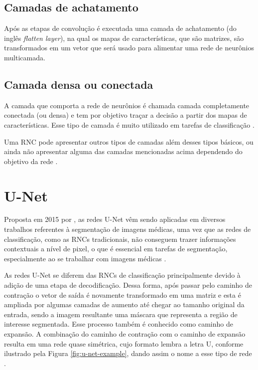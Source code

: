 \subsection{Camadas de achatamento}

Após as etapas de convolução é executada uma camada de achatamento (do inglês \textit{flatten layer}), na qual os mapas de características, que são matrizes, são transformados em um vetor que será usado para alimentar uma rede de neurônios multicamada. 

\subsection{Camada densa ou conectada}
A camada que comporta a rede de neurônios é chamada camada completamente conectada (ou densa) e tem por objetivo traçar a decisão a partir dos mapas de características. Esse tipo de camada é muito utilizado em tarefas de classificação \cite{rawat2017deep}.

Uma \ac{RNC} pode apresentar outros tipos de camadas além desses tipos básicos, ou ainda não apresentar alguma das camadas mencionadas acima dependendo do objetivo da rede \cite{mueller2019deep}.

\section{U-Net}
Proposta em 2015 por \cite{ronneberger2015u}, as redes U-Net vêm sendo aplicadas em diversos trabalhos referentes à segmentação de imagens médicas, uma vez que as redes de classificação, como as \ac{RNC}s tradicionais, não conseguem trazer informações contextuais a nível de pixel, o que é essencial em tarefas de segmentação, especialmente ao se trabalhar com imagens médicas \cite{siddique2021u}. 

As redes U-Net se diferem das \ac{RNC}s de classificação principalmente devido à adição de uma etapa de decodificação. Dessa forma, após passar pelo caminho de contração o vetor de saída é novamente transformado em uma matriz e esta é ampliada por algumas camadas de aumento até chegar ao tamanho original da entrada, sendo a imagem resultante uma máscara que representa a região de interesse segmentada. Esse processo também é conhecido como caminho de expansão. A combinação do caminho de contração com o caminho de expansão resulta em uma rede quase simétrica, cujo formato lembra a letra U, conforme ilustrado pela Figura \ref{fig:u-net-example}, dando assim o nome a esse tipo de rede \cite{ronneberger2015u}.


